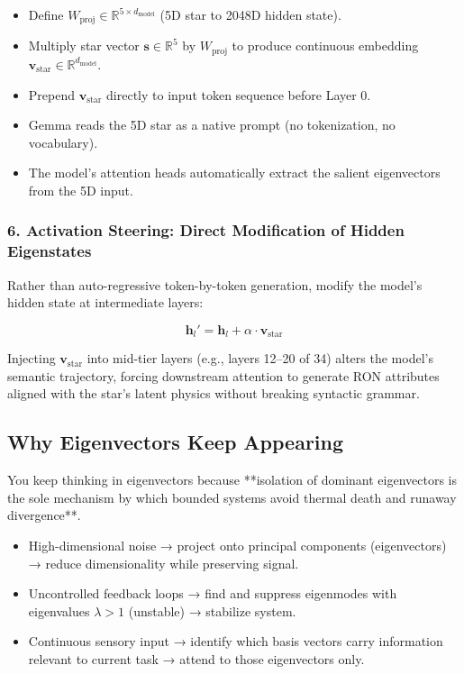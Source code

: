 \documentclass[11pt,oneside]{article}
\theoremstyle{definition}
\begin{document}
\begin{itemize}
  \item Define $W_{\text{proj}} \in \mathbb{R}^{5 \times d_{\text{model}}}$ (5D star to 2048D hidden state).
  \item Multiply star vector $\mathbf{s} \in \mathbb{R}^5$ by $W_{\text{proj}}$ to produce continuous embedding $\mathbf{v}_{\text{star}} \in \mathbb{R}^{d_{\text{model}}}$.
  \item Prepend $\mathbf{v}_{\text{star}}$ directly to input token sequence before Layer 0.
  \item Gemma reads the 5D star as a native prompt (no tokenization, no vocabulary).
  \item The model's attention heads automatically extract the salient eigenvectors from the 5D input.
\end{itemize}

\subsubsection{6. Activation Steering: Direct Modification of Hidden Eigenstates}

Rather than auto-regressive token-by-token generation, modify the model's hidden state at intermediate layers:

\[
\mathbf{h}_l' = \mathbf{h}_l + \alpha \cdot \mathbf{v}_{\text{star}}
\]

Injecting $\mathbf{v}_{\text{star}}$ into mid-tier layers (e.g., layers 12--20 of 34) alters the model's semantic trajectory, forcing downstream attention to generate RON attributes aligned with the star's latent physics without breaking syntactic grammar.

\subsection{Why Eigenvectors Keep Appearing}

You keep thinking in eigenvectors because **isolation of dominant eigenvectors is the sole mechanism by which bounded systems avoid thermal death and runaway divergence**.

\begin{itemize}
  \item High-dimensional noise → project onto principal components (eigenvectors) → reduce dimensionality while preserving signal.
  \item Uncontrolled feedback loops → find and suppress eigenmodes with eigenvalues $\lambda > 1$ (unstable) → stabilize system.
  \item Continuous sensory input → identify which basis vectors carry information relevant to current task → attend to those eigenvectors only.
\end{itemize}
\end{document}
